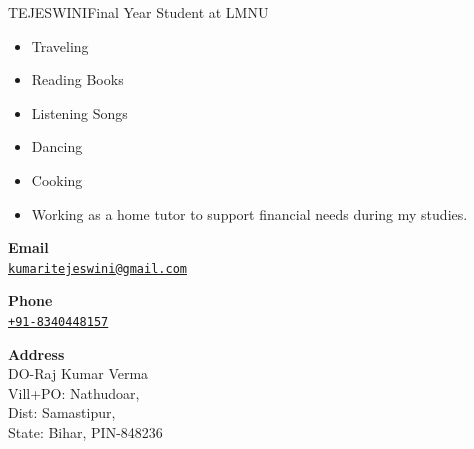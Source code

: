 \documentclass{article}
\begin{document}
\begin{cv}[avatar]{TEJESWINI}{Final Year Student at LMNU}

	\begin{cvevent}[]
		\begin{itemize}
			\item Traveling 
			\item Reading Books
			\item Listening Songs
			\item Dancing
			\item Cooking\\
		\end{itemize}
\end{cvevent}


\begin{cvevent}[2022][2023]
	\begin{itemize}
		\item Working as a home tutor to support financial needs during my studies.
	\end{itemize}
\end{cvevent}



\cvsidebar %



\begin{cvitem}[Envelope][4]
    \textbf{Email}\\
    \href{mailto:kumaritejeswini@gmail.com}{\texttt{kumaritejeswini@gmail.com}}
\end{cvitem}

\cvseparator[3]
\begin{cvitem}[Phone][4]
    \textbf{Phone}\\
    \href{tel:+918340448157}{\texttt{+91-8340448157}}
\end{cvitem}

\cvseparator[3]
\begin{cvitem}[Home][4]
    \textbf{Address}\\
    DO-Raj Kumar Verma\\ Vill+PO: Nathudoar,\\ Dist: Samastipur,\\State: Bihar, PIN-848236
\end{cvitem}


\end{cv}
\end{document}
